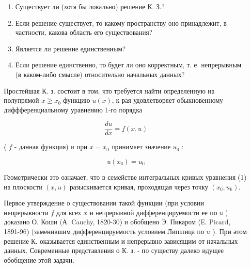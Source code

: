 \documentclass[10pt]{article}
\begin{document}
\begin{enumerate}

  \item Существует ли (хотя бы локально) решение К. З.?



  \item Если решение существует, то какому пространству оно принадлежит, в частности, какова область его существования?



  \item Является ли решение единственным?



  \item Если решение единственно, то будет ли оно корректным, т. е. непрерывным (в каком-либо смысле) относительно начальных данных?



\end{enumerate}



Простейшая К. з. состоит в том, что требуется найти определенную на полупрямой $x \geqslant x_{0}$ функцию $u(x)$, к-рая удовлетворяет обыкновенному диффференциальному уравнению 1-го порядка



\[

\frac{d u}{d x}=f(x, u)

\]



( $f$ - данная функция) и при $x=x_{0}$ принимает значение $u_{0}$ :



\[

u\left(x_{0}\right)=u_{0}

\]



Геометрически это означает, что в семействе интегральных кривых уравнения (1) на плоскости $(x, u)$ разыскивается кривая, проходящая через точку $\left(x_{0}, u_{0}\right)$.



Первое утверждение о существовании такой функции (при условии непрерывности $f$ для всех $x$ и непрерывной дифференцируемости ее по $u$ ) доказано О. Коши (А. Cauchy, 1820-30) и обобщено Э. Пикаром (Е. Picard, 1891-96) (заменившим дифференцируемость условием Липшица по $u$ ). При әтом решение К. оказывается единственным и непрерывно зависящим от начальных данных. Современные представления о К. з. - по существу далеко идущее обобщение этой задачи.
\end{document}
